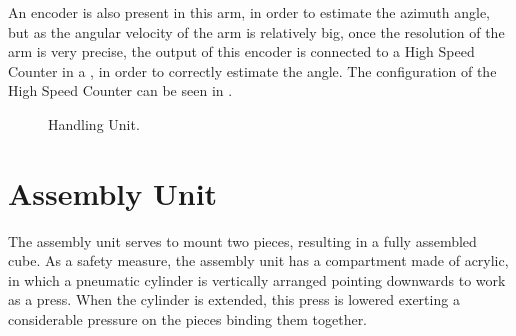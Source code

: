 An encoder is also present in this arm, in order to estimate the
azimuth angle, but as the angular velocity of the arm is relatively big, once
the resolution of the arm is very precise, the output of this encoder is connected to a High Speed
Counter in a \PLC, in order to correctly estimate the angle. The configuration
of the High Speed Counter can be seen in \cite{rochapereira2019automacao,antunesfloriano2019sincronizacao}.
\begin{figure}[H]
  \centering
  \caption{Handling Unit.}
  \label{fig:handlingUnit}
\end{figure}


\section{Assembly Unit}
\label{sec:assemblyUnit}
The assembly unit serves to mount two pieces, resulting in a fully assembled
cube. As a safety measure, the assembly unit has a compartment made of
acrylic, in which a pneumatic cylinder is vertically arranged pointing downwards
to work as a press.
When the cylinder is extended, this press is lowered exerting a considerable
pressure on the pieces binding them together.

